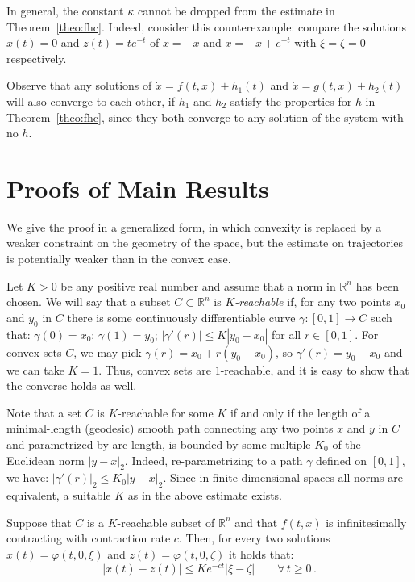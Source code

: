 \documentclass{svmult}
\newcommand{\opteqn}[1]{$#1$}
\newcommand{\mysubsection}[1]{\smallskip\noindent{\bf \emph{#1}.}}
\newcommand{\R}{{\mathbb R}}  %
\newcommand{\abs}[1]{\left\vert #1 \right\vert}
\newcommand{\be}[1]{\begin{equation}\label{#1}}
\newcommand{\ee}{\end{equation}}
\newcommand{\cc}{c}
\begin{document}
In general, the constant $\kappa $ cannot be dropped from the estimate
in Theorem~\ref{theo:fhc}.
Indeed, consider this counterexample: compare the solutions $x(t)=0$ and
$z(t)=te^{-t}$ of $\dot x=-x$ and $\dot x=-x+e^{-t}$ with $\xi =\zeta =0$ respectively.

Observe that any solutions of $\dot x=f(t,x)+h_1(t)$ and $\dot x=g(t,x)+h_2(t)$
will also converge to each other, if $h_1$ and $h_2$ satisfy the properties
for $h$ in Theorem~\ref{theo:fhc}, since they both converge to any solution
of the system with no $h$.

\section{Proofs of Main Results}
\label{sec:proofs}

\mysubsection{Proof of Theorem~\ref{theo:main}}
We give the proof in a generalized form, in which convexity is replaced by a
weaker constraint on the geometry of the space, but the estimate on
trajectories is potentially weaker than in the convex case.

Let $K>0$ be any positive real number and assume that a norm in $\R^n$ has
been chosen.
We will say that a subset $C\subset\R^n$ is \emph{$K$-reachable} if, for any
two points $x_0$ and $y_0$ in $C$ there is some continuously differentiable
curve $\gamma : \left[  0, 1 \right] \rightarrow C$ 
such that:
$\gamma \left(0\right) = x_0$;
$\gamma \left(1\right)=y_0$;
$\abs{\gamma '  \left(r\right)} \le K \abs{y_0 - x_0}$ for all $r\in [0,1]$. 
For convex sets $C$, we may pick $\gamma (r)=x_0+r(y_0-x_0)$, so 
$\gamma '(r)= y_0-x_0$ and we can take $K=1$.  Thus, convex sets are
$1$-reachable, and it is easy to show that the converse holds as well.

Note that a set $C$ is $K$-reachable for some $K$ if and only if the length
of a minimal-length (geodesic) smooth path connecting any two points $x$
and $y$ in $C$ and parametrized by arc length, is bounded by some multiple
$K_0$ of the Euclidean norm $\abs{y-x}_2$. Indeed, re-parametrizing to a path
$\gamma $ defined on $\left[0,1\right]$, we have:
\opteqn{
\abs{\gamma ' \left(r\right)}_2 \le K_0 \abs{y-x}_2.
}
Since in finite dimensional spaces all norms are equivalent, a
suitable $K$ as in the above estimate exists.

\begin{lemma}\label{theo:k-reachable}
Suppose that $C$ is a $K$-reachable subset of $\R^n$ and that $f(t,x)$ is
infinitesimally contracting with contraction rate $\cc$.
Then, for every two solutions $x(t)=\varphi(t,0,\xi )$ and $z(t)=\varphi(t,0,\zeta )$
it holds that:
\be{eqn:weak}
\abs{x(t)-z(t)} \leq  K e^{-\cc t} \abs{\xi -\zeta } 
\quad\quad\forall\,t\ge 0\,.
\ee
\end{lemma}
\end{document}
